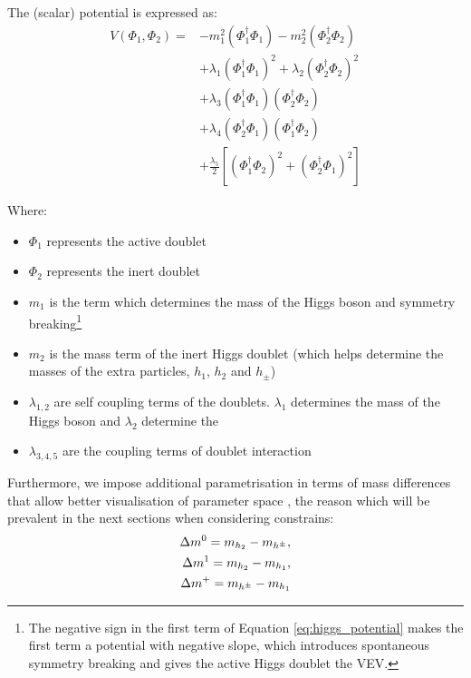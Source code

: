 \documentclass[12pt]{article}
\begin{document}
The (scalar) potential is expressed as:
\begin{equation}
    \begin{split}
        V(\Phi_1, \Phi_2) =& -m_1^2(\Phi_1^\dagger\Phi_1) - m_2^2(\Phi_2^\dagger\Phi_2)\\ 
        &+ \lambda_1(\Phi_1^\dagger\Phi_1)^2 + \lambda_2(\Phi_2^\dagger\Phi_2)^2 \\
        &+ \lambda_3(\Phi_1^\dagger\Phi_1)(\Phi_2^\dagger\Phi_2) \\
        &+ \lambda_4(\Phi_2^\dagger\Phi_1)(\Phi_1^\dagger\Phi_2)\\ 
        &+ \frac{\lambda_5}{2}[(\Phi_1^\dagger\Phi_2)^2 + (\Phi_2^\dagger\Phi_1)^2]
        \end{split}
        \label{eq:higgs_potential}
\end{equation}

Where:
\begin{itemize}
    \item $\Phi_1$ represents the active doublet
    \item $\Phi_2$ represents the inert doublet
    \item $m_1$ is the term which determines the mass of the Higgs boson and symmetry breaking\footnote{The negative sign in the first term of Equation \ref{eq:higgs_potential} makes the first term a potential with negative slope, which introduces spontaneous symmetry breaking and gives the active Higgs doublet the VEV.}
    \item $m_2$ is the mass term of the inert Higgs doublet (which helps determine the masses of the extra particles, $h_1$, $h_2$ and $h_\pm$)
    \item $\lambda_{1, 2}$ are self coupling terms of the doublets. $\lambda_1$ determines the mass of the Higgs boson and $\lambda_2$ determine the 
    \item $\lambda_{3, 4, 5}$ are the coupling terms of doublet interaction
\end{itemize}
Furthermore, we impose additional parametrisation in terms of mass differences that allow better visualisation of parameter space \cite{Belyaev_2022}, the reason which will be prevalent in the next sections when considering constrains:
\begin{align}
\label{eq:mass_diff_1}
    \Delta m^{0} = m_{h_2} - m_{h^\pm},\\ \notag
    \Delta m^1 = m_{h_2} - m_{h_1},\\ \notag
    \Delta m^+ = m_{h^\pm} - m_{h_1}
\end{align}
\end{document}
